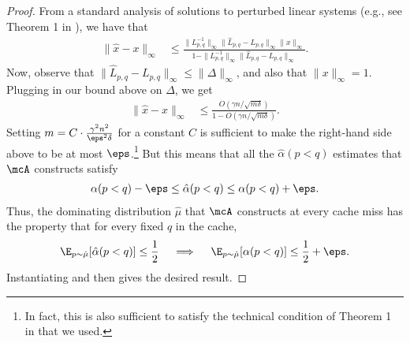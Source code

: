 \begin{proof}
    From a standard analysis of solutions to perturbed linear systems (e.g., see Theorem 1 in \citep{falknotes}), we have that
    \begin{align*}
        \|\hat{x}-x\|_\infty &\le \frac{\|L_{p,q}^{-1}\|_\infty \|\hat{L}_{p,q}-L_{p,q}\|_\infty \|x\|_\infty}{1-\|L_{p,q}^{-1}\|_\infty \|\hat{L}_{p,q}-L_{p,q}\|_\infty}.
    \end{align*}
    Now, observe that $\|\hat{L}_{p,q}-L_{p,q}\|_\infty \le \|\Delta\|_\infty$, and also that $\|x\|_\infty=1$. Plugging in our bound above on $\Delta$, we get
    \begin{align*}
        \|\hat{x}-x\|_\infty &\le \frac{O(\gamma n/\sqrt{m\delta})}{1-O(\gamma n/\sqrt{m\delta})}.
    \end{align*}
    Setting $m=C \cdot \frac{\gamma^2n^2}{\eps^2\delta}$ for a constant $C$ is sufficient to make the right-hand side above to be at most $\eps$.\footnote{In fact, this is also sufficient to satisfy the technical condition of Theorem 1 in \citep{falknotes} that we used.} But this means that all the $\hat{\alpha}(p<q)$ estimates that $\mcA$ constructs satisfy
    \begin{align*}
        {\alpha}(p<q)-\eps \le \hat{\alpha}(p<q) \le {\alpha}(p<q) + \eps.
    \end{align*}
    Thus, the dominating distribution $\hat{\mu}$ that $\mcA$ constructs at every cache miss has the property that for every fixed $q$ in the cache,
    \begin{align*}
        \E_{p \sim \hat{\mu}}[\hat{\alpha}(p<q)] \le \frac{1}{2} 
        \quad\implies\quad \E_{p \sim \hat{\mu}}[{\alpha}(p<q)] \le \frac{1}{2}+\eps.
    \end{align*}
    Instantiating  and  then gives the desired result.
\end{proof}
